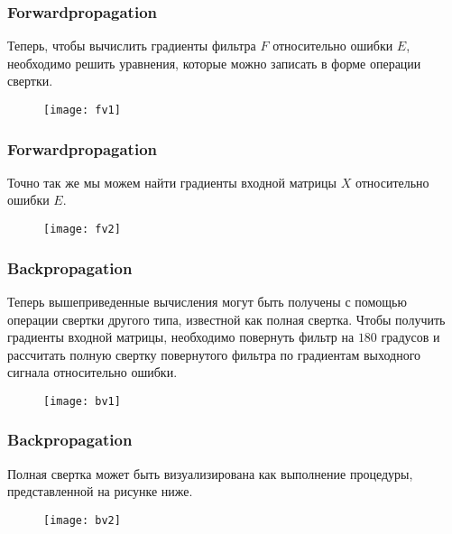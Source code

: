 \documentclass[unicode, notheorems]{beamer}
\begin{document}
	\begin{frame}
		\frametitle{Forwardpropagation}
		Теперь, чтобы вычислить градиенты фильтра $F$ относительно ошибки $E$, необходимо решить уравнения, которые можно записать в форме операции свертки.

		\begin{figure}[h]
			\begin{center}
				\begin{minipage}[h]{0.92\linewidth}
					\texttt{[image: fv1]}
				\end{minipage}
			\end{center}
		\end{figure}
	\end{frame}

\begin{frame}
	\frametitle{Forwardpropagation}
	Точно так же мы можем найти градиенты входной матрицы $X$ относительно ошибки $E$.
\begin{figure}[h]
			\begin{center}
				\begin{minipage}[h]{0.52\linewidth}
					\texttt{[image: fv2]}
				\end{minipage}
			\end{center}
		\end{figure}

\end{frame}

\begin{frame}
	\frametitle{Backpropagation}
	Теперь вышеприведенные вычисления могут быть получены с помощью операции свертки другого типа, известной как полная свертка. Чтобы получить градиенты входной матрицы, необходимо повернуть фильтр на $180$ градусов и рассчитать полную свертку повернутого фильтра по градиентам выходного сигнала относительно ошибки.
	\begin{figure}
		\begin{center}
				\begin{minipage}[h]{1.1\linewidth}
					\texttt{[image: bv1]}
				\end{minipage}
			\end{center}
		\end{figure}
\end{frame}

\begin{frame}
	\frametitle{Backpropagation}
	Полная свертка может быть визуализирована как выполнение процедуры, представленной на рисунке ниже.
	\begin{figure}
		\begin{center}
				\begin{minipage}[h]{0.65\linewidth}
					\texttt{[image: bv2]}
				\end{minipage}
			\end{center}
		\end{figure}
\end{frame}
\end{document}

